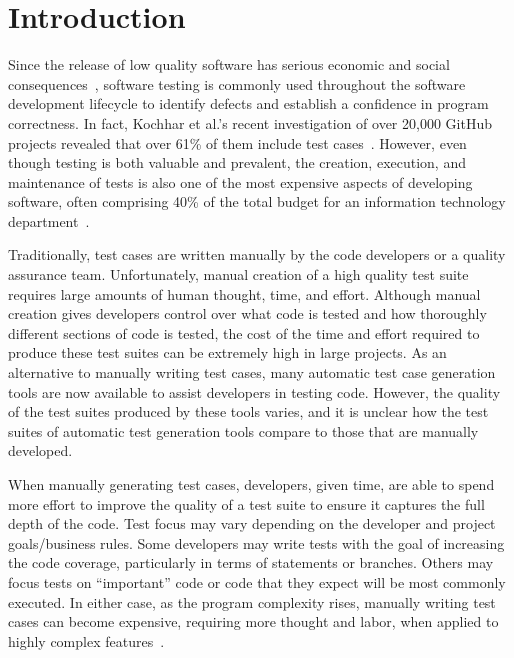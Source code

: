 
\section{Introduction}


Since the release of low quality software has serious economic and social consequences~\cite{tassey2002}, software testing is commonly used throughout the software development lifecycle to identify defects and establish a confidence in program correctness. In fact, Kochhar et al.'s recent investigation of over 20,000 GitHub projects revealed that over 61\% of them include test cases~\cite{kochhar2013}.  However, even though testing is both valuable and prevalent, the creation, execution, and maintenance of tests is also one of the most expensive aspects of developing software, often comprising 40\% of the total budget for an information technology department~\cite{vizard2013}.  

Traditionally, test cases are written manually by the code developers or a quality assurance team.  Unfortunately,
manual creation of a high quality test suite requires large amounts of human thought, time, and effort. Although manual
creation gives developers control over what code is tested and how thoroughly different sections of code is tested,  the
cost of the time and effort required to produce these test suites can be extremely high in large projects.  As an
alternative to manually writing test cases, many automatic test case generation tools are now available to assist
developers in testing code.  However, the quality of the test suites produced by these tools varies, and it is unclear
how the test suites of automatic test generation tools compare to those that are manually developed.

When manually generating test cases, developers, given time, are able to spend more effort to improve the quality of a test suite to ensure it captures the full depth of the code.  Test focus may vary depending on the developer and project goals/business rules.  Some developers may write tests with the goal of increasing the code coverage, particularly in terms of statements or branches.  Others may focus tests on ``important'' code or code that they expect will be most commonly executed.   In either case, as the program complexity rises, manually writing test cases can become expensive, requiring more thought and labor, when applied to highly complex features~\cite{clarke1998automated}.

